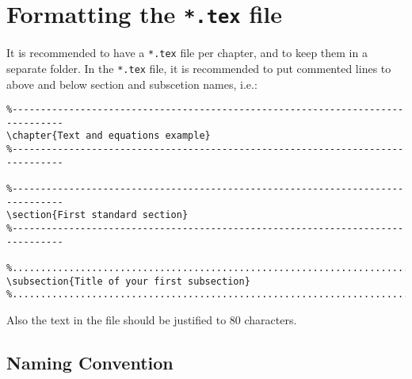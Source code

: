 \section{Formatting the \texorpdfstring{\texttt{*.tex}}{tex} file}

It is recommended to have a \texttt{*.tex} file per chapter, and to keep them
in a separate folder. In the \texttt{*.tex} file, it is recommended to put
commented lines to above and below section and subscetion names, i.e.:

\begin{scriptsize}
\begin{verbatim}
%-------------------------------------------------------------------------------
\chapter{Text and equations example}
%-------------------------------------------------------------------------------

%-------------------------------------------------------------------------------
\section{First standard section}
%-------------------------------------------------------------------------------

%...............................................................................
\subsection{Title of your first subsection}
%...............................................................................
\end{verbatim}
\end{scriptsize}

Also the text in the file should be justified to 80 characters.

\subsection{Naming Convention}

